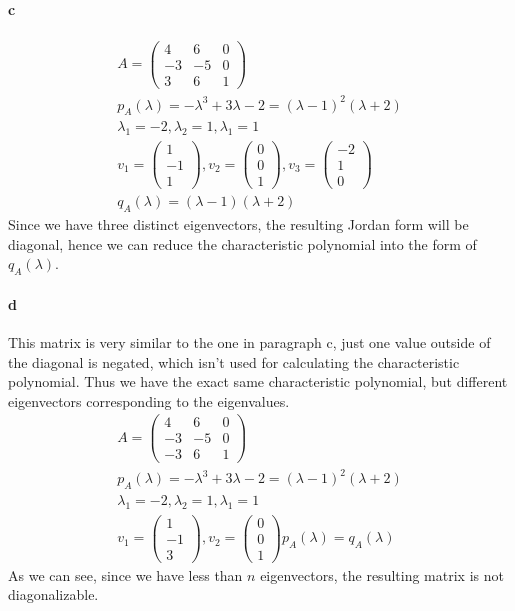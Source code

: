 \paragraph{c}
\begin{gather*}
A = \left( \begin{array}{ccc}
4&6&0\\
-3&-5&0\\
3&6&1
\end{array} \right)\\
p_A(\lambda) = -\lambda ^3  + 3 \lambda - 2 = (\lambda-1)^2(\lambda+2)\\
\lambda_1 =  -2,\lambda_2 =1 , \lambda_1 =1 \\
v_1 = \left( \begin{array}{c}
1\\
-1\\
1 
\end{array}\right),
v_2 = \left( \begin{array}{c}
0\\
0\\
1
\end{array} \right),
v_3 = \left( \begin{array}{c}
-2\\
1\\
0
\end{array} \right)\\
q_A(\lambda) = (\lambda-1)(\lambda+2)
\end{gather*}
Since we have three distinct eigenvectors, the resulting Jordan form will be diagonal, hence we can reduce the characteristic polynomial into the form of $q_A(\lambda)$.

\paragraph{d}
This matrix is very similar to the one in paragraph c, just one value outside of the diagonal is negated, which isn’t used for calculating the characteristic polynomial. Thus we have the exact same characteristic polynomial, but different eigenvectors corresponding to the eigenvalues.
\begin{gather*}
A = \left( \begin{array}{ccc}
4&6&0\\
-3&-5&0\\
-3&6&1
\end{array} \right)\\
p_A(\lambda) = -\lambda ^3  + 3 \lambda - 2 = (\lambda-1)^2(\lambda+2)\\
\lambda_1 =  -2,\lambda_2 =1 , \lambda_1 =1 \\
v_1 = \left( \begin{array}{c}
1\\
-1\\
3 
\end{array}\right),
v_2 = \left( \begin{array}{c}
0\\
0\\
1
\end{array} \right)
p_A(\lambda) = q_A(\lambda) 
\end{gather*}
As we can see, since we have less than $n$ eigenvectors, the resulting matrix is not diagonalizable.
